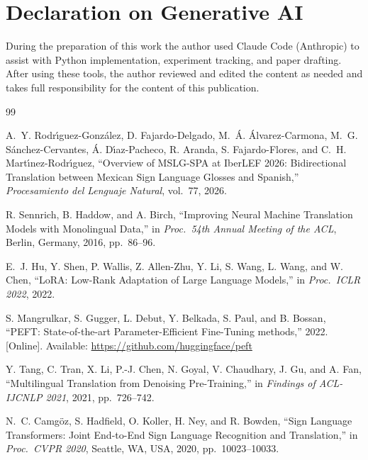 \documentclass[sigconf,screen]{ceurart}
\begin{document}
\section*{Declaration on Generative AI}

During the preparation of this work the author used Claude Code
(Anthropic) to assist with Python implementation, experiment tracking,
and paper drafting.
After using these tools, the author reviewed and edited the content as
needed and takes full responsibility for the content of this publication.

\begin{thebibliography}{99}

A.\ Y. Rodr\'{\i}guez-Gonz\'alez, D. Fajardo-Delgado,
M.\ \'A. \'Alvarez-Carmona, M.\ G. S\'anchez-Cervantes,
\'A. D\'{\i}az-Pacheco, R. Aranda, S. Fajardo-Flores, and
C.\ H. Mart\'{\i}nez-Rodr\'{\i}guez,
``Overview of MSLG-SPA at IberLEF 2026: Bidirectional Translation
between Mexican Sign Language Glosses and Spanish,''
\textit{Procesamiento del Lenguaje Natural}, vol.~77, 2026.

R. Sennrich, B. Haddow, and A. Birch,
``Improving Neural Machine Translation Models with Monolingual Data,''
in \textit{Proc.\ 54th Annual Meeting of the ACL},
Berlin, Germany, 2016, pp.~86--96.

E.\ J. Hu, Y. Shen, P. Wallis, Z. Allen-Zhu, Y. Li, S. Wang,
L. Wang, and W. Chen,
``LoRA: Low-Rank Adaptation of Large Language Models,''
in \textit{Proc.\ ICLR 2022}, 2022.

S. Mangrulkar, S. Gugger, L. Debut, Y. Belkada, S. Paul, and B. Bossan,
``PEFT: State-of-the-art Parameter-Efficient Fine-Tuning methods,''
2022. [Online]. Available: \url{https://github.com/huggingface/peft}

Y. Tang, C. Tran, X. Li, P.-J. Chen, N. Goyal, V. Chaudhary, J. Gu,
and A. Fan,
``Multilingual Translation from Denoising Pre-Training,''
in \textit{Findings of ACL-IJCNLP 2021}, 2021, pp.~726--742.

N.\ C. Camg\"{o}z, S. Hadfield, O. Koller, H. Ney, and R. Bowden,
``Sign Language Transformers: Joint End-to-End Sign Language
Recognition and Translation,''
in \textit{Proc.\ CVPR 2020}, Seattle, WA, USA, 2020,
pp.~10023--10033.


\end{thebibliography}
\end{document}
